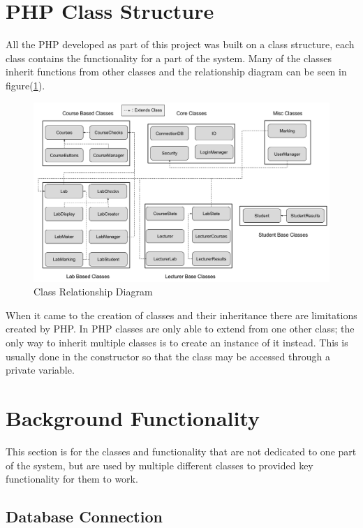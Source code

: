 \documentclass[11pt]{report}
\begin{document}
\newpage
\section{PHP Class Structure}

All the PHP developed as part of this project was built on a class structure, each class contains the functionality for a part of the system. Many of the classes inherit functions from other classes and the relationship diagram can be seen in figure(\ref{fig:implement-relationship}).

\begin{figure}[H]
    \centering
    \includegraphics[width=1\textwidth]{images/implementation/Class-Structure.png}
    \caption{Class Relationship Diagram}
    \label{fig:implement-relationship}
\end{figure}

When it came to the creation of classes and their inheritance there are limitations created by PHP. In PHP classes are only able to extend from one other class; the only way to inherit multiple classes is to create an instance of it instead. This is usually done in the constructor  so that the class may be accessed through a private variable.




\section{Background Functionality}

This section is for the classes and functionality that are not dedicated to one part of the system, but are used by multiple different classes to provided key functionality for them to work.  

\subsection{Database Connection}
\end{document}
